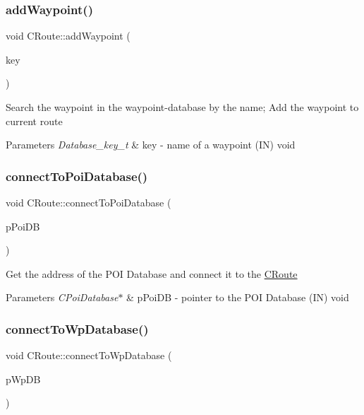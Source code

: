\subsubsection{\texorpdfstring{add\+Waypoint()}{addWaypoint()}}
{\footnotesize\ttfamily void C\+Route\+::add\+Waypoint (\begin{DoxyParamCaption}\item[{\hyperlink{CRoute_8h_a112678f2c32c39b2d50c558d89dbde68}{Database\+\_\+key\+\_\+t}}]{key }\end{DoxyParamCaption})}

Search the waypoint in the waypoint-\/database by the name; Add the waypoint to current route 
\begin{DoxyParams}{Parameters}
{\em Database\+\_\+key\+\_\+t} & key -\/ name of a waypoint (IN)  void \\
\hline
\end{DoxyParams}
\mbox{\label{classCRoute_a04173f3a28fb020f0704a0703956836f}} 
\subsubsection{\texorpdfstring{connect\+To\+Poi\+Database()}{connectToPoiDatabase()}}
{\footnotesize\ttfamily void C\+Route\+::connect\+To\+Poi\+Database (\begin{DoxyParamCaption}\item[{\hyperlink{classCPoiDatabase}{C\+Poi\+Database} $\ast$}]{p\+Poi\+DB }\end{DoxyParamCaption})}

Get the address of the P\+OI Database and connect it to the \hyperlink{classCRoute}{C\+Route} 
\begin{DoxyParams}{Parameters}
{\em C\+Poi\+Database$\ast$} & p\+Poi\+DB -\/ pointer to the P\+OI Database (IN)  void \\
\hline
\end{DoxyParams}
\mbox{\label{classCRoute_a0efb25d5f4c3167b189c03cbcd3d64f9}} 
\subsubsection{\texorpdfstring{connect\+To\+Wp\+Database()}{connectToWpDatabase()}}
{\footnotesize\ttfamily void C\+Route\+::connect\+To\+Wp\+Database (\begin{DoxyParamCaption}\item[{\hyperlink{classCWpDatabase}{C\+Wp\+Database} $\ast$}]{p\+Wp\+DB }\end{DoxyParamCaption})}

